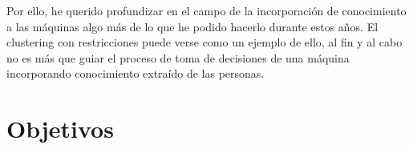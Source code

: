 Por ello, he querido profundizar en el campo de la incorporación de conocimiento a las máquinas algo más de lo que he podido hacerlo durante estos años. El clustering con restricciones puede verse como un ejemplo de ello, al fin y al cabo no es más que guiar el proceso de toma de decisiones de una máquina incorporando conocimiento extraído de las personas.

\section{Objetivos}
































